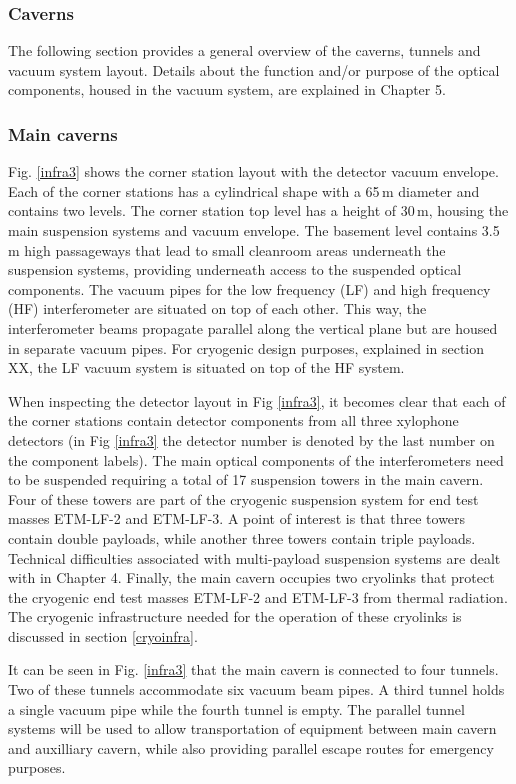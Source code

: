 \subsubsection{Caverns}
The following section provides a general overview of the caverns, tunnels and vacuum system layout. Details about the function and/or purpose of the optical components, housed in the vacuum system, are explained in Chapter 5.

\subsubsection*{Main caverns}
Fig. \ref{infra3} shows the corner station layout with the detector vacuum envelope. Each of the corner stations has a cylindrical shape with a 65\,m diameter and contains two levels. The corner station top level has a height of 30\,m, housing the main suspension systems and vacuum envelope. The basement level contains 3.5\,m high passageways that lead to small cleanroom areas underneath the suspension systems, providing underneath access to the suspended optical components. The vacuum pipes for the low frequency (LF) and high frequency (HF) interferometer are situated on top of each other. This way, the interferometer beams propagate parallel along the vertical plane but are housed in separate vacuum pipes. For cryogenic design purposes, explained in section XX, the LF vacuum system is situated on top of the HF system.

When inspecting the detector layout in Fig \ref{infra3}, it becomes clear that each of the corner stations contain detector components from all three xylophone detectors (in Fig \ref{infra3} the detector number is denoted by the last number on the component labels). The main optical components of the interferometers need to be suspended requiring a total of 17 suspension towers in the main cavern. Four of these towers are part of the cryogenic suspension system for end test masses ETM-LF-2 and ETM-LF-3. A point of interest is that three towers contain double payloads, while another three towers contain triple payloads. Technical difficulties associated with multi-payload suspension systems are dealt with in Chapter 4. Finally, the main cavern occupies two cryolinks that protect the cryogenic end test masses ETM-LF-2 and ETM-LF-3 from thermal radiation. The cryogenic infrastructure needed for the operation of these cryolinks is discussed in section \ref{cryoinfra}.

It can be seen in Fig. \ref{infra3} that the main cavern is connected to four tunnels. Two of these tunnels accommodate six vacuum beam pipes. A third tunnel holds a single vacuum pipe while the fourth tunnel is empty. The parallel tunnel systems will be used to allow transportation of equipment between main cavern and auxilliary cavern, while also providing parallel escape routes for emergency purposes.

